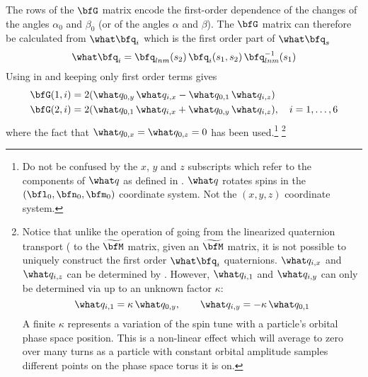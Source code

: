 {The rows of the $\bfG$ matrix encode the first-order dependence of the changes of the angles
$\alpha_0$ and $\beta_0$ (or of the angles $\alpha$ and $\beta$).  The $\bfG$ matrix can therefore
be calculated from $\what\bfq_i$ which is the first order part of $\what\bfq_s$
\begin{equation}
  \what\bfq_i = \bfq_{lnm}(s_2) \, \bfq_i(s_1, s_2) \, \bfq_{lnm}^{-1}(s_1)
\end{equation}
Using  in  and keeping only first order terms gives
\begin{align}
  \bfG(1,i) &= 2 (\what q_{0,y} \, \what q_{i,x} - \what q_{0,1} \, \what q_{i,z}) 
  \label{g2qqqq} \\
  \bfG(2,i) &= 2 (\what q_{0,1} \, \what q_{i,x} + \what q_{0,y} \, \what q_{i,z}),
  \quad i = 1, \ldots, 6
  \nonumber
\end{align}
where the fact that $\what q_{0,x} = \what q_{0,z} = 0$ has been used.\footnote
  {
Do not be confused by the $x$, $y$ and $z$ subscripts which refer to the components of $\what q$
as defined in . $\what q$ rotates spins in the $(\bfl_0, \bfn_0, \bfm_0)$ coordinate system.
Not the $(x, y, z)$ coordinate system.
  }
\footnote
  {
Notice that unlike the operation of going from the linearized quaternion transport ( to the
$\widetilde\bfM$ matrix, given an $\widetilde\bfM$ matrix, it is not possible to uniquely construct
the first order $\what\bfq_i$ quaternions. $\what q_{i,x}$ and $\what q_{i,z}$ can be determined by
. However, $\what q_{i,1}$ and $\what q_{i,y}$ can only be determined via  up
to an unknown factor $\kappa$:
\begin{equation}
  \what q_{i,1} = \kappa \, \what q_{0,y}, \qquad \what q_{i,y} = -\kappa \, \what q_{0,1}
\end{equation}
A finite $\kappa$ represents a variation of the spin tune with a particle's orbital phase space
position. This is a non-linear effect which will average to zero over many turns as a particle with
constant orbital amplitude samples different points on the phase space torus it is on.
  }

}
